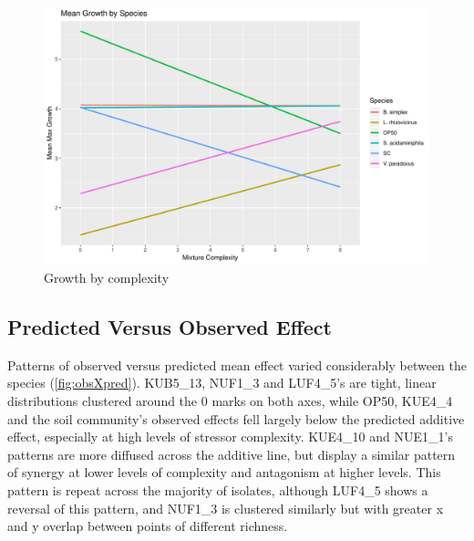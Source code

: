 \documentclass[final,1p,times]{elsarticle}
\begin{document}
\begin{figure}[H]
    \centering
    \includegraphics[width = \textwidth]{Scripts/Results/Final_Pipeline/growthXrichness.pdf}
    \caption{Growth by complexity}
    \label{fig:growthXcomplex}
\end{figure}

\newpage
\subsection{Predicted Versus Observed Effect}
\label{S:3:5}

Patterns of observed versus predicted mean effect varied considerably between the species (\cref{fig:obsXpred}). KUB5\_13, NUF1\_3 and LUF4\_5’s are tight, linear distributions clustered around the 0 marks on both axes, while OP50, KUE4\_4 and the soil community’s observed effects fell largely below the predicted additive effect, especially at high levels of stressor complexity. KUE4\_10 and NUE1\_1’s patterns are more diffused across the additive line, but display a similar pattern of synergy at lower levels of complexity and antagonism at higher levels. This pattern is repeat across the majority of isolates, although LUF4\_5 shows a reversal of this pattern, and NUF1\_3 is clustered similarly but with greater x and y overlap between points of different richness.
\end{document}
